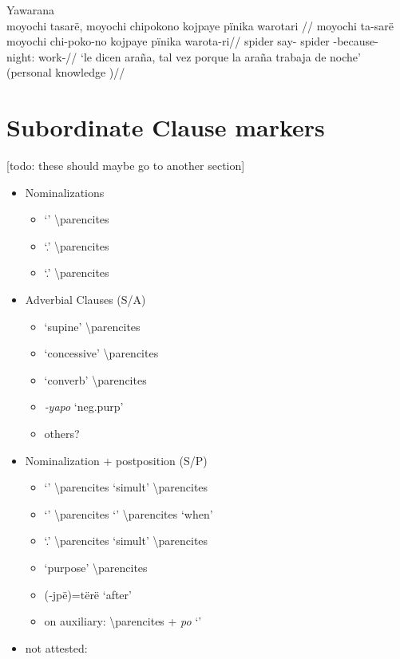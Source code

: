 \documentclass{memoir}
\begin{document}
\ex  Yawarana  \\\label{ctoaragrme-25}
\begingl \glpreamble moyochi tasarë, moyochi chipokono kojpaye pïnika warotari //
\gla moyochi ta-sarë moyochi chi-poko-no kojpaye pïnika warota-ri//
\glb spider say- spider -because- night:  work-//
\glft ‘le dicen araña, tal vez porque la araña trabaja de noche’ (personal knowledge
)//
\endgl
\xe

\section{Subordinate Clause markers}

{[}todo: these should maybe go to another section{]}

\begin{itemize}
\tightlist
\item
  Nominalizations

  \begin{itemize}
  \tightlist
  \item
     `' \textbackslash parencites
  \item
     `.' \textbackslash parencites
  \item
     `.' \textbackslash parencites
  \end{itemize}
\item
  Adverbial Clauses (S/A)

  \begin{itemize}
  \tightlist
  \item
     `supine' \textbackslash parencites
  \item
     `concessive' \textbackslash parencites
  \item
     `converb' \textbackslash parencites
  \item
    \emph{‑yapo} `neg.purp'
  \item
    others?
  \end{itemize}
\item
  Nominalization + postposition (S/P)

  \begin{itemize}
  \tightlist
  \item
     `' \textbackslash parencites `simult'
    \textbackslash parencites
  \item
     `' \textbackslash parencites  `'
    \textbackslash parencites `when'
  \item
     `.' \textbackslash parencites
    `simult' \textbackslash parencites
  \item
     `purpose' \textbackslash parencites
  \item
    (‑jpë)=tërë `after'
  \item
    on auxiliary:  \textbackslash parencites + \emph{po}
    `'
  \end{itemize}
\item
  not attested:


\end{itemize}
\end{document}
